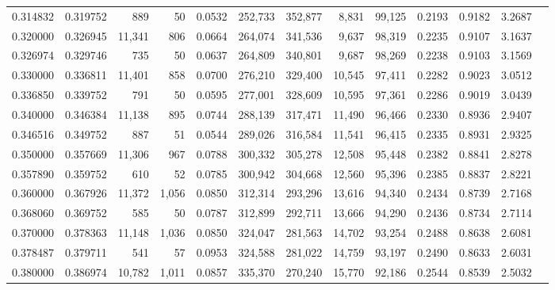 \begin{tabular}{rrrrrrrrrrrrr}
0.314832 & 0.319752 &    889 &    50 &                                     0.0532 & 252,733 & 352,877 &   8,831 &  99,125 & 0.2193 & 0.9182 & 3.2687 \\
0.320000 & 0.326945 & 11,341 &   806 &                                     0.0664 & 264,074 & 341,536 &   9,637 &  98,319 & 0.2235 & 0.9107 & 3.1637 \\
0.326974 & 0.329746 &    735 &    50 &                                     0.0637 & 264,809 & 340,801 &   9,687 &  98,269 & 0.2238 & 0.9103 & 3.1569 \\
0.330000 & 0.336811 & 11,401 &   858 &                                     0.0700 & 276,210 & 329,400 &  10,545 &  97,411 & 0.2282 & 0.9023 & 3.0512 \\
0.336850 & 0.339752 &    791 &    50 &                                     0.0595 & 277,001 & 328,609 &  10,595 &  97,361 & 0.2286 & 0.9019 & 3.0439 \\
0.340000 & 0.346384 & 11,138 &   895 &                                     0.0744 & 288,139 & 317,471 &  11,490 &  96,466 & 0.2330 & 0.8936 & 2.9407 \\
0.346516 & 0.349752 &    887 &    51 &                                     0.0544 & 289,026 & 316,584 &  11,541 &  96,415 & 0.2335 & 0.8931 & 2.9325 \\
0.350000 & 0.357669 & 11,306 &   967 &                                     0.0788 & 300,332 & 305,278 &  12,508 &  95,448 & 0.2382 & 0.8841 & 2.8278 \\
0.357890 & 0.359752 &    610 &    52 &                                     0.0785 & 300,942 & 304,668 &  12,560 &  95,396 & 0.2385 & 0.8837 & 2.8221 \\
0.360000 & 0.367926 & 11,372 & 1,056 &                                     0.0850 & 312,314 & 293,296 &  13,616 &  94,340 & 0.2434 & 0.8739 & 2.7168 \\
0.368060 & 0.369752 &    585 &    50 &                                     0.0787 & 312,899 & 292,711 &  13,666 &  94,290 & 0.2436 & 0.8734 & 2.7114 \\
0.370000 & 0.378363 & 11,148 & 1,036 &                                     0.0850 & 324,047 & 281,563 &  14,702 &  93,254 & 0.2488 & 0.8638 & 2.6081 \\
0.378487 & 0.379711 &    541 &    57 &                                     0.0953 & 324,588 & 281,022 &  14,759 &  93,197 & 0.2490 & 0.8633 & 2.6031 \\
0.380000 & 0.386974 & 10,782 & 1,011 &                                     0.0857 & 335,370 & 270,240 &  15,770 &  92,186 & 0.2544 & 0.8539 & 2.5032 \\

\end{tabular}
